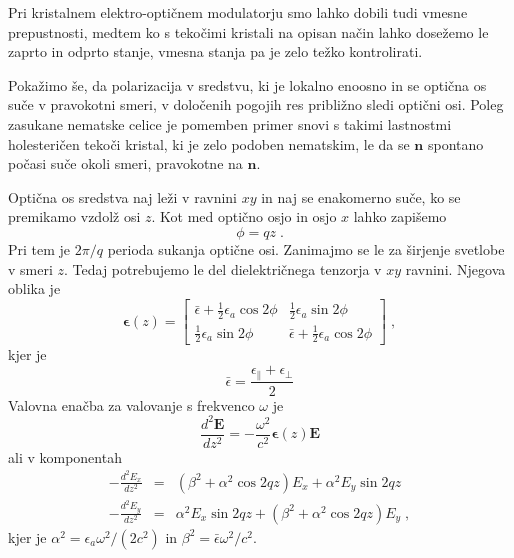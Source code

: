 Pri kristalnem elektro-optičnem modulatorju smo lahko dobili tudi vmesne
prepustnosti, medtem ko s tekočimi kristali na opisan način lahko
dosežemo le zaprto in odprto stanje, vmesna stanja pa je zelo težko
kontrolirati.

Pokažimo še, da polarizacija v sredstvu, ki je lokalno enoosno in
se optična os suče v pravokotni smeri, v določenih pogojih res približno
sledi optični osi. Poleg zasukane nematske celice je pomemben primer
snovi s takimi lastnostmi holesteričen tekoči kristal, ki je zelo
podoben nematskim, le da se $\mathbf{n}$ spontano počasi suče okoli
smeri, pravokotne na $\mathbf{n}$.

Optična os sredstva naj leži v ravnini $xy$ in naj se enakomerno
suče, ko se premikamo vzdolž osi $z$. Kot med optično osjo in osjo
$x$ lahko zapišemo 
\begin{equation}
\phi=qz\;.\label{7.58}
\end{equation}
 Pri tem je $2\pi/q$ perioda sukanja optične osi. Zanimajmo se le
za širjenje svetlobe v smeri $z$. Tedaj potrebujemo le del dielektričnega
tenzorja v $xy$ ravnini. Njegova oblika je 
\begin{equation}
\boldsymbol{\epsilon}(z)=\left[\begin{array}{cc}
\bar{\epsilon}+\frac{1}{2}\epsilon_{a}\cos2\phi & \frac{1}{2}\epsilon_{a}\sin2\phi\\
\frac{1}{2}\epsilon_{a}\sin2\phi & \bar{\epsilon}+\frac{1}{2}\epsilon_{a}\cos2\phi
\end{array}\right]\;,\label{7.59}
\end{equation}
 kjer je 
\begin{equation}
\bar{\epsilon}=\frac{\epsilon_{\parallel}+\epsilon_{\perp}}{2}\label{7.60}
\end{equation}
 Valovna enačba za valovanje s frekvenco $\omega$ je 
\begin{equation}
\frac{d^{2}\mathbf{E}}{dz^{2}}=-\frac{\omega^{2}}{c^{2}}\boldsymbol{\epsilon}(z)\mathbf{E}\label{7.61}
\end{equation}
 ali v komponentah 
\begin{eqnarray}
-\frac{d^{2}E_{x}}{dz^{2}} & = & (\beta^{2}+\alpha^{2}\cos2qz)E_{x}+\alpha^{2}E_{y}\sin2qz\nonumber \\
-\frac{d^{2}E_{y}}{dz^{2}} & = & \alpha^{2}E_{x}\sin2qz+(\beta^{2}+\alpha^{2}\cos2qz)E_{y}\;,
\end{eqnarray}
 kjer je $\alpha^{2}=\epsilon_{a}\omega^{2}/(2c^{2})$ in $\beta^{2}=\bar{\epsilon}\omega^{2}/c^{2}$.

